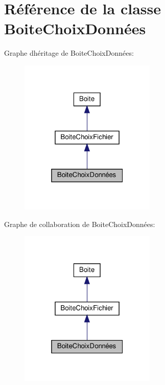 \hypertarget{class_boite_choix_donn_xC3_xA9es}{}\section{Référence de la classe Boite\+Choix\+Données}
\label{class_boite_choix_donn_xC3_xA9es}


Graphe d\textquotesingle{}héritage de Boite\+Choix\+Données\+:\nopagebreak
\begin{figure}[H]
\begin{center}
\leavevmode
\includegraphics[width=184pt]{class_boite_choix_donn_xC3_xA9es__inherit__graph}
\end{center}
\end{figure}


Graphe de collaboration de Boite\+Choix\+Données\+:\nopagebreak
\begin{figure}[H]
\begin{center}
\leavevmode
\includegraphics[width=184pt]{class_boite_choix_donn_xC3_xA9es__coll__graph}
\end{center}
\end{figure}
